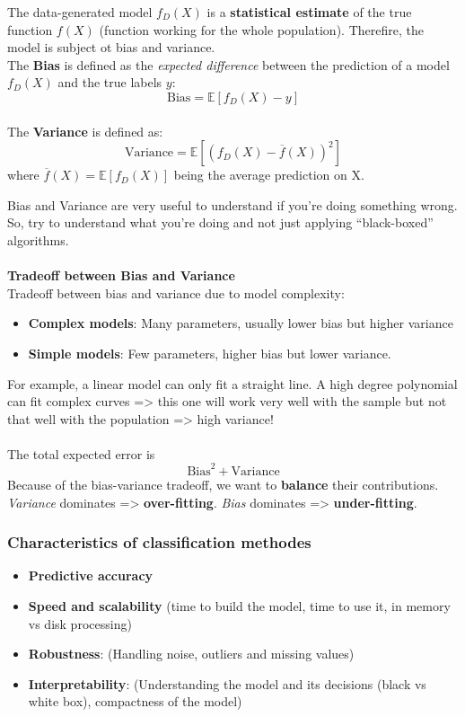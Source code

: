 The data-generated model $f_D(X)$ is a \textbf{statistical estimate} of the true function $f(X)$ (function working for the whole population). Therefire, the model is subject ot bias and variance. 
\\
The \textbf{Bias} is defined as the \emph{expected difference} between the prediction of a model $f_D(X)$ and the true labels $y$:
\[
 \textrm{Bias} = \mathbb{E}\left[ f_D(X)-y\right]
\]
\\
The \textbf{Variance} is defined as:
\[
 \textrm{Variance} = \mathbb{E}\left[\left(f_D(X) - \overline{f}(X)\right)^2\right]
\]
where $\overline{f}(X) = \mathbb{E}\left[f_D(X)\right]$ being the average prediction on X.

Bias and Variance are very useful to understand if you're doing something wrong. So, try to understand what you're doing and not just applying ``black-boxed'' algorithms.
\\\\
\textbf{Tradeoff between Bias and Variance}
\\
Tradeoff between bias and variance due to model complexity:
\begin{itemize}
 \item \textbf{Complex models}: Many parameters, usually lower bias but higher variance
 \item \textbf{Simple models}: Few parameters, higher bias but lower variance.
\end{itemize}

For example, a linear model can only fit a straight line. A high degree polynomial can fit complex curves => this one will work very well with the sample but not that well with the population => high variance!
\\\\
The total expected error is 
\[
 \textrm{Bias}^2 + \textrm{Variance}
\]
Because of the bias-variance tradeoff, we want to \textbf{balance} their contributions. \emph{Variance} dominates => \textbf{over-fitting}. \emph{Bias} dominates => \textbf{under-fitting}.


\subsubsection{Characteristics of classification methodes} 

\begin{itemize}
\item \textbf{Predictive accuracy}
\item \textbf{Speed and scalability} (time to build the model, time to use it, in memory vs disk processing)
\item \textbf{Robustness}: (Handling noise, outliers and missing values) 
\item \textbf{Interpretability}: (Understanding the model and its decisions (black vs white box), compactness of the model)
\end{itemize}

